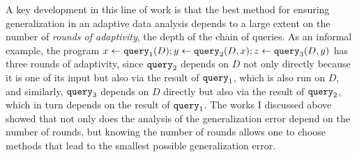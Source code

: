  A key development in this line of work is that the best method for ensuring generalization in an adaptive data analysis depends to a large extent on the number of \emph{rounds of adaptivity}, the depth of the chain of queries. 
 As an informal example, the program $x \leftarrow {\tt query}_1(D);y \leftarrow {\tt query}_2(D,x);z \leftarrow {\tt query}_3(D,y)$ has three rounds of adaptivity, since ${\tt query}_2$ depends on $D$ not only directly because it is one of its input but also via the result of ${\tt query}_1$, 
 which is also run on $D$, and similarly, ${\tt query}_3$ depends on $D$ directly but also via the result of ${\tt query}_2$, which in turn depends on the result of ${\tt query}_1$. 
 The works I discussed above showed that not only does the analysis of the generalization error depend on the number of rounds, 
 but knowing the number of rounds allows one to choose methods that lead to the smallest possible generalization error. 
 
